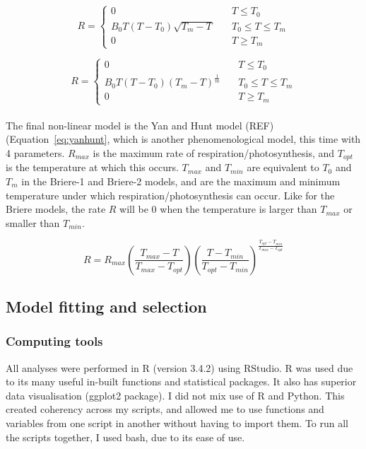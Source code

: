 \documentclass[11pt]{article}
\begin{document}
	
	\begin{equation} \label{eq:briere}
	R = \left\{
			\begin{array}{ll}
			0 & \quad T \leq T_0 \\
            B_0 T (T-T_0) \sqrt{T_m - T} & \quad T_0 \leq T \leq T_m \\
            0 & \quad T \geq T_m
			\end{array}
	\right.
	\end{equation}
	
	\begin{equation} \label{eq:briere2}
	R = \left\{
			\begin{array}{ll}
			0 & \quad T \leq T_0 \\
            B_0 T (T-T_0) (T_m-T)^\frac{1}{m} & \quad T_0 \leq T \leq T_m \\
            0 & \quad T \geq T_m
			\end{array}
	\right.
	\end{equation}
	\\
	The final non-linear model is the Yan and Hunt model (REF) (Equation~\ref{eq:yanhunt}, which is another phenomenological model, this time with 4 parameters. $R_{max}$ is the maximum rate of respiration/photosynthesis, and $T_{opt}$ is the temperature at which this occurs. $T_{max}$ and $T_{min}$ are equivalent to $T_0$ and $T_m$ in the Briere-1 and Briere-2 models, and are the maximum and minimum temperature under which respiration/photosynthesis can occur. Like for the Briere models, the rate $R$ will be 0 when the temperature is larger than $T_{max}$ or smaller than $T_{min}$.
	
	\begin{equation} \label{eq:yanhunt}
	R = R_{max} 
		\left(
			\frac{T_{max} - T}{T_{max} - T_{opt}}
		\right) 
		\left(
			\frac{T - T_{min}}{T_{opt} - T_{min}}
		\right)
			^\frac{T_{opt} - T_{min}}{T_{max} - T_{opt}}
	\end{equation}

	\subsection{Model fitting and selection}
	\subsubsection*{Computing tools}
	All analyses were performed in R (version 3.4.2) using RStudio. R was used due to its many useful in-built functions and statistical packages. It also has superior data visualisation (ggplot2 package). I did not mix use of R and Python. This created coherency across my scripts, and allowed me to use functions and variables from one script in another without having to import them. To run all the scripts together, I used bash, due to its ease of use.
	
\end{document}
